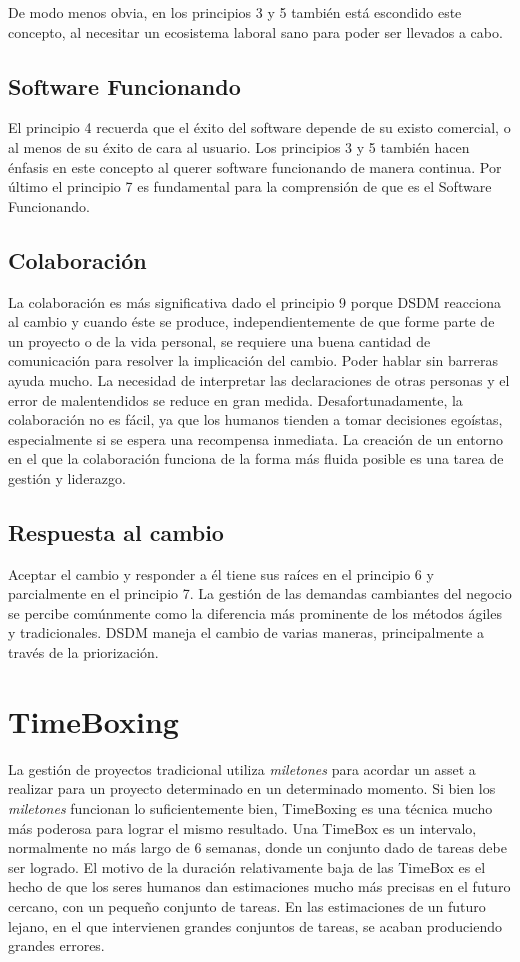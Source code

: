 \documentclass[12pt,a4paper]{article}
\begin{document}
De modo menos obvia, en los principios 3 y 5 también está escondido este concepto, al necesitar un ecosistema laboral sano para poder ser llevados a cabo.

\subsection{Software Funcionando}

El principio 4 recuerda que el éxito del software depende de su existo comercial, o al menos de su éxito de cara al usuario. Los principios 3 y 5 también hacen énfasis en este concepto al querer software funcionando de manera continua. Por último el principio 7 es fundamental para la comprensión de que es el Software Funcionando.


\subsection{Colaboración}

La colaboración es más significativa dado el principio 9 porque DSDM reacciona al cambio y cuando éste se produce, independientemente de que forme parte de un proyecto o de la vida personal, se requiere una buena cantidad de comunicación para resolver la implicación del cambio.  Poder hablar sin barreras  ayuda mucho. La necesidad de interpretar las declaraciones de otras personas y el error de malentendidos se reduce en gran medida.  Desafortunadamente, la colaboración no es fácil, ya que los humanos tienden a tomar decisiones egoístas, especialmente si se espera una recompensa inmediata.  La creación de un entorno en el que la colaboración funciona de la forma más fluida posible es una tarea de gestión y liderazgo.

\subsection{Respuesta al cambio}
Aceptar el cambio y responder a él tiene sus raíces en el principio 6 y parcialmente en el principio 7.  La gestión de las demandas cambiantes del negocio se percibe comúnmente como la diferencia más prominente de los métodos ágiles y tradicionales. DSDM maneja el cambio de varias maneras, principalmente a través de la priorización.

\section{TimeBoxing}
La gestión de proyectos tradicional utiliza \emph{miletones} para acordar un asset a realizar para un proyecto determinado en un determinado momento. Si bien los \emph{miletones} funcionan lo suficientemente bien, TimeBoxing es una técnica mucho más poderosa para lograr el mismo resultado. Una TimeBox es un intervalo, normalmente no más largo de 6 semanas, donde un conjunto dado de tareas debe ser logrado. El motivo de la duración relativamente baja de las TimeBox es el hecho de que los seres humanos dan estimaciones mucho más precisas en el futuro cercano, con un pequeño conjunto de tareas.
En las estimaciones de un futuro lejano, en el que intervienen grandes conjuntos de tareas, se acaban produciendo grandes errores.\\
\end{document}
